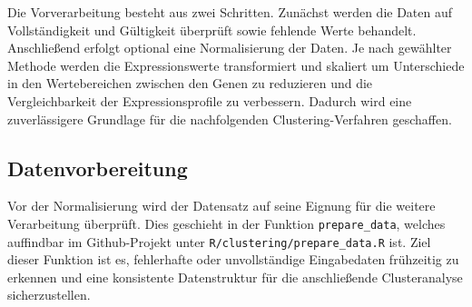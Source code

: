 \documentclass[12pt]{article}
\begin{document}
Die Vorverarbeitung besteht aus zwei Schritten. Zunächst werden die Daten auf Vollständigkeit und Gültigkeit überprüft sowie fehlende Werte behandelt. Anschließend erfolgt optional eine Normalisierung der Daten. Je nach gewählter Methode werden die Expressionswerte transformiert und skaliert um Unterschiede in den Wertebereichen zwischen den Genen zu reduzieren und die Vergleichbarkeit der Expressionsprofile zu verbessern. Dadurch wird eine zuverlässigere Grundlage für die nachfolgenden Clustering-Verfahren geschaffen.

\subsection{Datenvorbereitung}
\label{datenvorbereitung}

Vor der Normalisierung wird der Datensatz auf seine Eignung für die weitere Verarbeitung überprüft. Dies geschieht in der Funktion \texttt{prepare\_data}, welches auffindbar im Github-Projekt unter \texttt{R/clustering/prepare\_data.R} ist. Ziel dieser Funktion ist es, fehlerhafte oder unvollständige Eingabedaten frühzeitig zu erkennen und eine konsistente Datenstruktur für die anschließende Clusteranalyse sicherzustellen.
\end{document}
